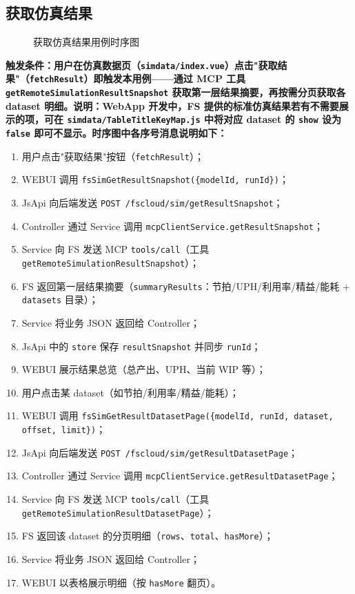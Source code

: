 \subsection{获取仿真结果}
\begin{figure}[!h]
	\centering
	\resizebox{1.0\linewidth}{!}{}
	\caption{获取仿真结果用例时序图}\label{fig:fetchResult}
\end{figure}
\bf{触发条件}：用户在仿真数据页（\texttt{simdata/index.vue}）点击"获取结果"（\texttt{fetchResult}）即触发本用例——通过 MCP 工具 \texttt{getRemoteSimulationResultSnapshot} 获取第一层结果摘要，再按需分页获取各 dataset 明细。\bf{说明}：WebApp 开发中，FS 提供的标准仿真结果若有不需要展示的项，可在 \texttt{simdata/TableTitleKeyMap.js} 中将对应 dataset 的 \texttt{show} 设为 \texttt{false} 即可不显示。时序图中各序号消息说明如下：
\begin{enumerate}[label=\arabic*)]
	\item 用户点击"获取结果"按钮（\texttt{fetchResult}）；
	\item WEBUI 调用 \texttt{fsSimGetResultSnapshot(\{modelId, runId\})}；
	\item JsApi 向后端发送 \texttt{POST /fscloud/sim/getResultSnapshot}；
	\item Controller 通过 Service 调用 \texttt{mcpClientService.getResultSnapshot}；
	\item Service 向 FS 发送 MCP \texttt{tools/call}（工具 \texttt{getRemoteSimulationResultSnapshot}）；
	\item FS 返回第一层结果摘要（\texttt{summaryResults}：节拍/UPH/利用率/精益/能耗 + \texttt{datasets} 目录）；
	\item Service 将业务 JSON 返回给 Controller；
	\item JsApi 中的 \texttt{store} 保存 \texttt{resultSnapshot} 并同步 \texttt{runId}；
	\item WEBUI 展示结果总览（总产出、UPH、当前 WIP 等）；
	\item 用户点击某 dataset（如节拍/利用率/精益/能耗）；
	\item WEBUI 调用 \texttt{fsSimGetResultDatasetPage(\{modelId, runId, dataset, offset, limit\})}；
	\item JsApi 向后端发送 \texttt{POST /fscloud/sim/getResultDatasetPage}；
	\item Controller 通过 Service 调用 \texttt{mcpClientService.getResultDatasetPage}；
	\item Service 向 FS 发送 MCP \texttt{tools/call}（工具 \texttt{getRemoteSimulationResultDatasetPage}）；
	\item FS 返回该 dataset 的分页明细（\texttt{rows}、\texttt{total}、\texttt{hasMore}）；
	\item Service 将业务 JSON 返回给 Controller；
	\item WEBUI 以表格展示明细（按 \texttt{hasMore} 翻页）。
\end{enumerate}
\newpage

